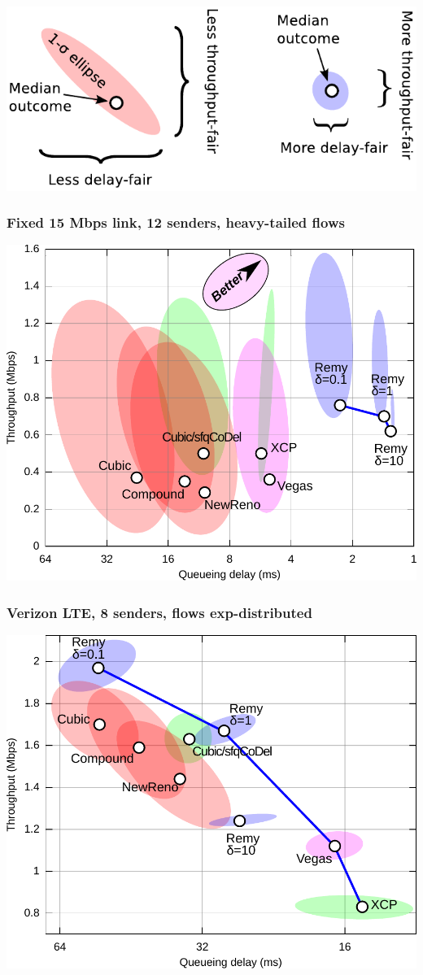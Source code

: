 \documentclass[svgnames]{beamer}
\begin{document}
\begin{frame}

\noindent \includegraphics[width=8.5 cm]{legend.pdf}

\end{frame}

\begin{frame}
\frametitle{Fixed 15 Mbps link, 12 senders, heavy-tailed flows}

\noindent \includegraphics[width=8.5 cm]{eth12-final-flowcdf.pdf}

\end{frame}

\begin{frame}
\frametitle{Verizon LTE, 8 senders, flows exp-distributed}

\noindent \includegraphics[width=8.5 cm]{vzw-8-final.pdf}

\end{frame}
\end{document}
